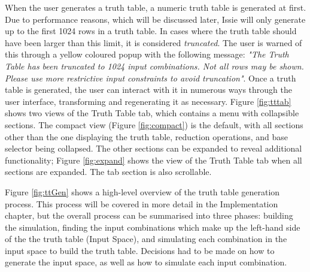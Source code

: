 When the user generates a truth table, a numeric truth table is generated at first. Due to performance reasons, which will be discussed later, Issie will only generate up to the first 1024 rows in a truth table. In cases where the truth table should have been larger than this limit, it is considered \textit{truncated}. The user is warned of this through a yellow coloured popup with the following message: \textit{"The Truth Table has been truncated to 1024 input combinations. Not all rows may be shown. Please use more restrictive input constraints to avoid truncation"}. Once a truth table is generated, the user can interact with it in numerous ways through the user interface, transforming and regenerating it as necessary. Figure \ref{fig:tttab} shows two views of the Truth Table tab, which contains a menu with collapsible sections. The compact view (Figure \ref{fig:compact}) is the default, with all sections other than the one displaying the truth table, reduction operations, and base selector being collapsed. The other sections can be expanded to reveal additional functionality; Figure \ref{fig:expand} shows the view of the Truth Table tab when all sections are expanded. The tab section is also scrollable.

Figure \ref{fig:ttGen} shows a high-level overview of the truth table generation process. This process will be covered in more detail in the Implementation chapter, but the overall process can be summarised into three phases: building the simulation, finding the input combinations which make up the left-hand side of the the truth table (Input Space), and simulating each combination in the input space to build the truth table. Decisions had to be made on how to generate the input space, as well as how to simulate each input combination.

